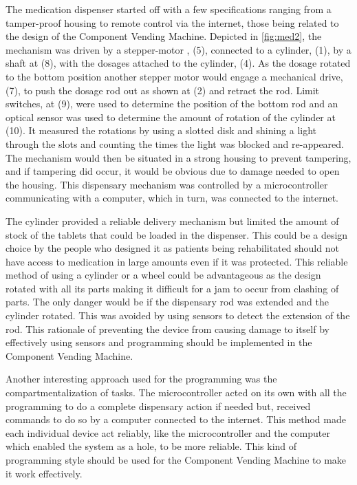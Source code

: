 \documentclass[a4paper,11pt]{article}
\newcommand*{\halfref}[1]{\hyperref[{#1}]{\autoref*{#1}}}
\numberwithin{figure}{section}
\numberwithin{table}{section}
\begin{document}
The medication dispenser started off with a few specifications ranging from a tamper-proof housing to remote control via the internet, those being related to the design of the Component Vending Machine. Depicted in  \halfref{fig:med2}, the mechanism was driven by a stepper-motor , (5), connected to a cylinder, (1), by a shaft at (8), with the dosages attached to the cylinder, (4). As the dosage rotated to the bottom position another stepper motor would engage a mechanical drive, (7), to push the dosage rod out as shown at (2) and retract the rod. Limit switches, at (9), were used to determine the position of the bottom rod and an optical sensor was used to determine the amount of rotation of the cylinder at (10). It measured the rotations by using a slotted disk and shining a light through the slots and counting the times the light was blocked and re-appeared. The mechanism would then be situated in a strong housing to prevent tampering, and if tampering did occur, it would be obvious due to damage needed to open the housing. This dispensary mechanism was controlled by a microcontroller communicating with a computer, which in turn, was connected to the internet. 

The cylinder provided a reliable delivery mechanism but limited the amount of stock of the tablets that could be loaded in the dispenser. This could be a design choice by the people who designed it as patients being rehabilitated should not have access to medication in large amounts even if it was protected. This reliable method of using a cylinder or a wheel could be advantageous as the design rotated with all its parts making it difficult for a jam to occur from clashing of parts. The only danger would be if the dispensary rod was extended and the cylinder rotated. This was avoided by using sensors to detect the extension of the rod. This rationale of preventing the device from causing damage to itself by effectively using sensors and programming should be implemented in the Component Vending Machine.

Another interesting approach used for the programming was the compartmentalization of tasks. The microcontroller acted on its own with all the programming to do a complete dispensary action if needed but, received commands to do so by a computer connected to the internet. This method made each individual device act reliably, like the microcontroller and the computer which enabled the system as a hole, to be more reliable. This kind of programming style should be used for the Component Vending Machine to make it work effectively.
\end{document}
